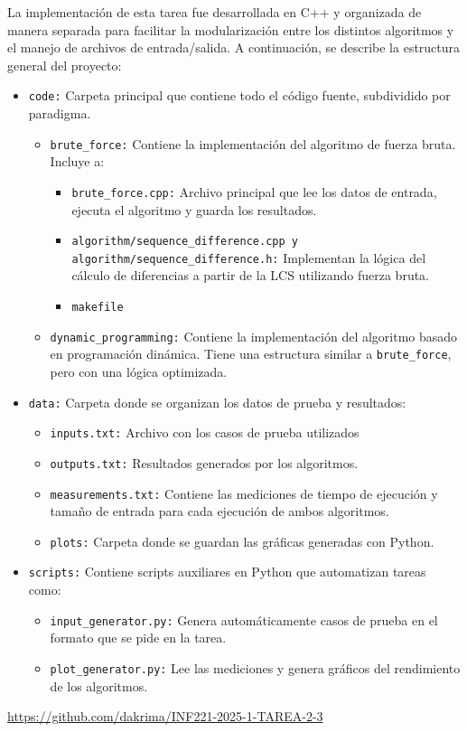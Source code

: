 La implementación de esta tarea fue desarrollada en C++ y organizada de manera separada para facilitar la modularización entre los distintos algoritmos y el manejo de archivos de entrada/salida. A continuación, se describe la estructura general del proyecto:

\begin{itemize}
    \item \texttt{code:} Carpeta principal que contiene todo el código fuente, subdividido por paradigma.
    \begin{itemize}
        \item \texttt{brute\_force:} Contiene la implementación del algoritmo de fuerza bruta. Incluye a:
        \begin{itemize}
            \item \texttt{brute\_force.cpp:} Archivo principal que lee los datos de entrada, ejecuta el algoritmo y guarda los resultados.
            \item \texttt{algorithm/sequence\_difference.cpp y algorithm/sequence\_difference.h:} Implementan la lógica del cálculo de diferencias a partir de la LCS utilizando fuerza bruta.
            \item \texttt{makefile}
        \end{itemize}
        \item \texttt{dynamic\_programming:} Contiene la implementación del algoritmo basado en programación dinámica. Tiene una estructura similar a \texttt{brute\_force}, pero con una lógica optimizada.
    \end{itemize}
    \item \texttt{data:} Carpeta donde se organizan los datos de prueba y resultados:
    \begin{itemize}
        \item \texttt{inputs.txt:} Archivo con los casos de prueba utilizados
        \item \texttt{outputs.txt:} Resultados generados por los algoritmos.
        \item \texttt{measurements.txt:} Contiene las mediciones de tiempo de ejecución y tamaño de entrada para cada ejecución de ambos algoritmos.
        \item \texttt{plots:} Carpeta donde se guardan las gráficas generadas con Python.
    \end{itemize}
    \item \texttt{scripts:} Contiene scripts auxiliares en Python que automatizan tareas como:
    \begin{itemize}
        \item \texttt{input\_generator.py:} Genera automáticamente casos de prueba en el formato que se pide en la tarea.
        \item \texttt{plot\_generator.py:} Lee las mediciones y genera gráficos del rendimiento de los algoritmos.

    \end{itemize}
\end{itemize}

\begin{mdframed}
    \begin{center}
        {\Large \url{https://github.com/dakrima/INF221-2025-1-TAREA-2-3}}
    \end{center}
\end{mdframed}